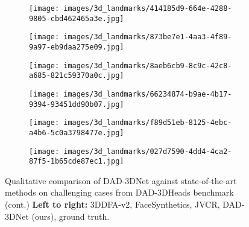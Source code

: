 \documentclass[10pt,twocolumn,letterpaper]{article}
\begin{document}
\begin{figure*}[t]
        \begin{subfigure}[t]{0.85\textwidth}
        \texttt{[image: images/3d\_landmarks/414185d9-664e-4288-9805-cbd462465a3e.jpg]}
    \end{subfigure}
        \begin{subfigure}[t]{0.85\textwidth}
        \texttt{[image: images/3d\_landmarks/873be7e1-4aa3-4f89-9a97-eb9daa275e09.jpg]}
    \end{subfigure}
        \begin{subfigure}[t]{0.85\textwidth}
        \texttt{[image: images/3d\_landmarks/8aeb6cb9-8c9c-42c8-a685-821c59370a0c.jpg]}
    \end{subfigure}
    \begin{subfigure}[t]{0.85\textwidth}
        \texttt{[image: images/3d\_landmarks/66234874-b9ae-4b17-9394-93451dd90b07.jpg]}
    \end{subfigure}
        \begin{subfigure}[t]{0.85\textwidth}
        \texttt{[image: images/3d\_landmarks/f89d51eb-8125-4ebc-a4b6-5c0a3798477e.jpg]}
    \end{subfigure}
            \begin{subfigure}[t]{0.85\textwidth}
        \texttt{[image: images/3d\_landmarks/027d7590-4dd4-4ca2-87f5-1b65cde87ec1.jpg]}
    \end{subfigure}
  \caption{Qualitative comparison of DAD-3DNet against state-of-the-art methods on challenging cases from DAD-3DHeads benchmark (cont.)  \textbf{Left to right:} 3DDFA-v2\cite{guo2020towards}, FaceSynthetics\cite{wood2021fake}, JVCR\cite{jvcr}, DAD-3DNet (ours), ground truth.}

\end{figure*}
\end{document}

